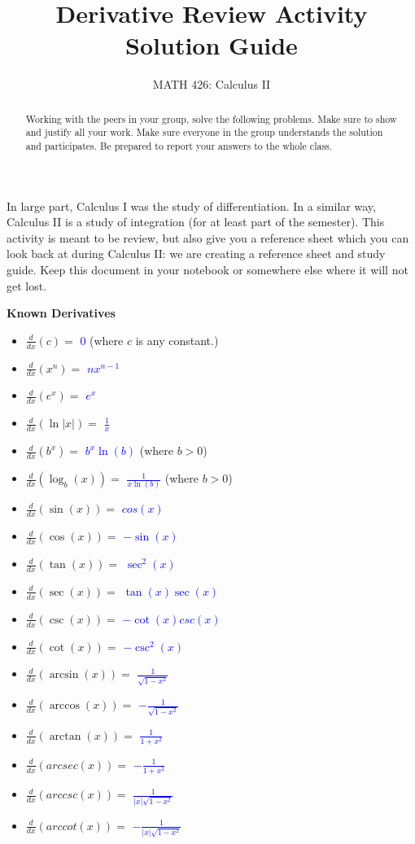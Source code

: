 \documentclass{ximera}
\title{Derivative Review Activity Solution Guide }
\author{MATH 426: Calculus II}
\begin{document}
\begin{abstract}
   Working with the peers in your group, solve the following problems. Make sure to show and justify all your work. Make sure everyone in the group understands the solution and participates. Be prepared to report your answers to the whole class. 
\end{abstract}
\maketitle

In large part, Calculus I was the study of differentiation.  In a similar way, Calculus II is a study of integration (for at least part of the semester).  This activity is meant to be review, but also give you a reference sheet which you can look back at during Calculus II: we are creating a reference sheet and study guide.  Keep this document in your notebook or somewhere else where it will not get lost.

\begin{exercise}
   \textbf{Known Derivatives}
   \begin{itemize}
    \item $\frac{d}{dx}(c)=$ \textcolor{blue}{$0$} (where $c$ is any constant.) 
    \item $\frac{d}{dx}(x^n)=$ \textcolor{blue}{$nx^{n-1}$}
    \item $\frac{d}{dx}(e^x)=$ \textcolor{blue}{$e^x$}
    \item $\frac{d}{dx}(\ln|x|)=$ \textcolor{blue}{$\frac{1}{x}$}
    \item $\frac{d}{dx}(b^x)=$ \textcolor{blue}{$b^x\ln(b)$} (where $b>0$) 
    \item $\frac{d}{dx}(\log_b(x))=$ \textcolor{blue}{$\frac{1}{x\ln(b)}$} (where $b>0$)
    \item $\frac{d}{dx}(\sin(x))=$ \textcolor{blue}{$cos(x)$}
    \item $\frac{d}{dx}(\cos(x))=$ \textcolor{blue}{$-\sin(x)$}
    \item $\frac{d}{dx}(\tan(x))=$ \textcolor{blue}{$\sec^2(x)$}
    \item $\frac{d}{dx}(\sec(x))=$ \textcolor{blue}{$\tan(x)\sec(x)$}
    \item $\frac{d}{dx}(\csc(x))=$ \textcolor{blue}{$-\cot(x)csc(x)$}
    \item $\frac{d}{dx}(\cot(x))=$ \textcolor{blue}{$-\csc^2(x)$}
    \item $\frac{d}{dx}(\arcsin(x))=$ \textcolor{blue}{$\frac{1}{\sqrt{1-x^2}}$}
    \item $\frac{d}{dx}(\arccos(x))=$ \textcolor{blue}{$-\frac{1}{\sqrt{1-x^2}}$}
    \item $\frac{d}{dx}(\arctan(x))=$ \textcolor{blue}{$\frac{1}{1+x^2}$}
    \item $\frac{d}{dx}(arcsec(x))=$ \textcolor{blue}{$-\frac{1}{1+x^2}$}
    \item $\frac{d}{dx}(arccsc(x))=$ \textcolor{blue}{$\frac{1}{|x|\sqrt{1-x^2}}$}
    \item $\frac{d}{dx}(arccot(x))=$ \textcolor{blue}{$-\frac{1}{|x|\sqrt{1-x^2}}$}
   \end{itemize}
\end{exercise}
\end{document}
